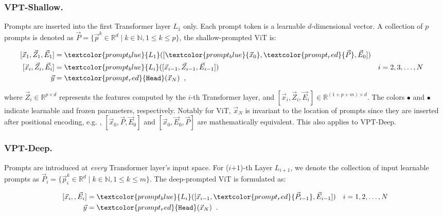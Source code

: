 \subsubsection{VPT-Shallow.}
Prompts are inserted into the first Transformer layer $L_1$ only. Each prompt token is a learnable $d$-dimensional vector. A collection of $p$ prompts is denoted as 
$\vec{P}=\{\vec{p}^k\in\mathbb{R}^d\mid k\in\mathbb{N}, 1\le k\le p\}$, the shallow-prompted ViT is:

\begin{align}
\label{eq:shallow}
    [\vec{x}_{1}, \vec{Z}_{1}, \vec{E}_{1}] &= \textcolor{prompt_blue}{L_1}([\textcolor{prompt_blue}{\vec{x}_{0}}, \textcolor{prompt_red}{\vec{P}},\vec{E}_{0}])   \\
    [\vec{x}_{i}, \vec{Z}_{i}, \vec{E}_{i}] &= \textcolor{prompt_blue}{L_i}([\vec{x}_{i-1}, \vec{Z}_{i-1},\vec{E}_{i-1}])  &&i=2, 3, \ldots, N\\
    \vec{y} &= \textcolor{prompt_red}{\texttt{Head}}(\vec{x}_N)\;\;,
\end{align}

where $\vec{Z}_{i}\in\mathbb{R}^{p\times d}$ represents the features computed by the $i$-th Transformer layer, and $[\vec{x}_{i}, \vec{Z}_{i}, \vec{E}_{i}]\in\mathbb{R}^{(1+p+m)\times d}$. The colors \textcolor{prompt_red}{$\bullet$} and \textcolor{prompt_blue}{$\bullet$} indicate \textcolor{prompt_red}{learnable} and \textcolor{prompt_blue}{frozen} parameters, respectively. Notably for ViT, $\vec{x}_N$ is invariant to the location of prompts since they are inserted after positional encoding, e.g. , $[\vec{x}_{0}, \vec{P},\vec{E}_{0}]$ and $[\vec{x}_{0}, \vec{E}_{0}, \vec{P}]$ are mathematically equivalent. This also applies to VPT-Deep.

\subsubsection{VPT-Deep.}
Prompts are introduced at \emph{every} Transformer layer's input space. For ($i$+$1$)-th Layer $L_{i+1}$, we denote the collection of input learnable prompts as 
$\vec{P}_{i}=\{\vec{p}_i^k\in\mathbb{R}^d\mid k\in\mathbb{N}, 1\le k\le m\}$. The deep-prompted ViT is formulated as:

\begin{align}
\label{eq:deep}
    [\vec{x}_i, \underline{}, \vec{E}_i] &= \textcolor{prompt_blue}{L_i}([\vec{x}_{i-1}, \textcolor{prompt_red}{\vec{P}_{i-1}},\vec{E}_{i-1}]) &&i=1, 2, \ldots, N\\
    \vec{y} &= \textcolor{prompt_red}{\texttt{Head}}(\vec{x}_N)\;\;.
\end{align}

